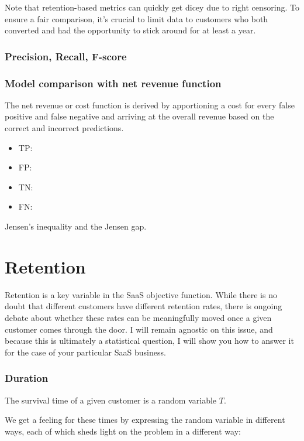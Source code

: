\documentclass{article}
\begin{document}
Note that retention-based metrics can quickly get dicey due to right censoring. To ensure a fair comparison, it's crucial to limit data to customers who both converted and had the opportunity to stick around for at least a year.

\subsubsection{Precision, Recall, F-score}

\subsubsection{Model comparison with net revenue function}

The net revenue or cost function is derived by apportioning a cost for every false positive and false negative and arriving at the overall revenue based on the correct and incorrect predictions.

\begin{itemize}
\item TP: 
\item FP:
\item TN:
\item FN: 
\end{itemize}

Jensen's inequality and the Jensen gap.



\section{Retention}

Retention is a key variable in the SaaS objective function. While there is no doubt that different customers have different retention rates, there is ongoing debate about whether these rates can be meaningfully moved once a given customer comes through the door. I will remain agnostic on this issue, and because this is ultimately a statistical question, I will show you how to answer it for the case of your particular SaaS business.




\subsubsection{Duration}

The survival time of a given customer is a random variable $T$.

We get a feeling for these times by expressing the random variable in different ways, each of which sheds light on the problem in a different way:
\end{document}

